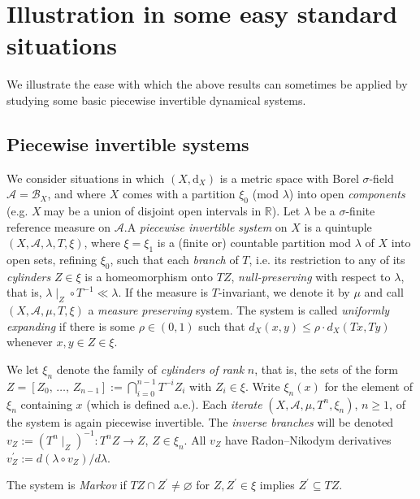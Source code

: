 \documentclass[AHL,Unicode,longabstracts]{cedram}
\newcommand{\clA}{\mathcal{A}}
\newcommand{\clB}{\mathcal{B}}
\newcommand{\rmd}{\mathrm{d}}
\newcommand{\bbR}{\mathbb{R}}
\begin{document}
\section{Illustration in some easy standard situations}\label{Sec_GMmaps}

We illustrate the ease with which the above results can sometimes be applied by studying some basic piecewise invertible dynamical systems.

\subsection{Piecewise invertible systems}
We consider situations in which $(X,\rmd_{X})$ is a metric space with Borel $\sigma$-field $\clA=\clB_{X}$, and where $X$ comes with a partition $\xi_{0}$ (mod $\lambda$) into open \emph{components} (e.g. $X\ $may be a union of disjoint open intervals in $\bbR$). Let $\lambda$ be a $\sigma$-finite reference measure on $\clA$.\linebreak A \emph{piecewise invertible system} on $X$ is a quintuple $(X,\clA,\lambda,T,\xi)$, where $\xi=\xi_{1}$ is a (finite or) countable partition mod $\lambda$ of $X$ into open sets, refining $\xi_{0}$, such that each \emph{branch} of $T$, i.e. its restriction to any of its \emph{cylinders} $Z\in\xi$ is a homeomorphism onto $TZ$,
\emph{null-preserving} with respect to $\lambda$, that is, $\lambda\mid _{Z}\circ T^{-1}\ll\lambda$. If the measure is $T$-invariant, we denote it by $\mu$ and call $(X,\clA,\mu,T,\xi)$ a \emph{measure preserving} system. The system is called \emph{uniformly expanding} if there is some $\rho \in(0,1)$ such that $d_{X}(x,y)\leq\rho\cdot d_{X}(Tx,Ty)$ whenever $x,y\in Z\in\xi$.

We let $\xi_{n}$ denote the family of \emph{cylinders of rank }$n$, that is, the sets of the form $Z=[Z_{0},\,\ldots,\,Z_{n-1}]:=\bigcap_{i=0}^{n-1}T^{-i} Z_{i}$ with $Z_{i}\in\xi$. Write $\xi_{n}(x)$ for the element of $\xi_{n}$ containing $x$ (which is defined a.e.). Each \emph{iterate} $(X,\clA,\mu,T^{n},\xi_{n})$, $n\geq1$, of the system is again piecewise invertible. The \emph{inverse branches} will be denoted $v_{Z}:=(T^{n}\mid_{Z})^{-1} :T^{n}Z\rightarrow Z$, $Z\in\xi_{n}$. All $v_{Z}$ have Radon--Nikodym derivatives $v_{Z}^{\prime}:=d(\lambda\circ v_{Z})/d\lambda$.

The system is \emph{Markov} if $TZ\cap Z^{\prime}\neq\varnothing$ for $Z,Z^{\prime}\in\xi$ implies $Z^{\prime}\subseteq TZ$.
\end{document}
